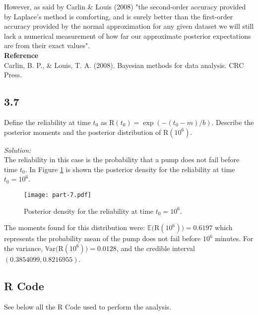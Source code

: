 \documentclass[a4paper, 11pt]{article}
\begin{document}
However, as said by Carlin \& Louis (2008) "the second-order accuracy provided by Laplace’s method is comforting, and is surely better than the first-order accuracy provided by the normal approximation for any given dataset we will still lack a numerical measurement of how far our approximate posterior expectations are from their exact values". \\

\noindent
\textbf{Reference} \\
Carlin, B. P., \& Louis, T. A. (2008). Bayesian methods for data analysis. CRC Press.

\subsection*{3.7} Define the reliability at time $t_0$ as R$(t_0) = \exp(-(t_0 -m)/b)$. Describe the posterior moments and the posterior distribution of R$(10^6)$.

\noindent
\textit{Solution:}\\

The reliability in this case is the probability that a pump does not fail before time $t_0$. In Figure \ref{fig5} is shown the posterior density for the reliability at time $t_0 = 10^6$. 

\begin{figure}[H]
\centering
\caption{Posterior density for the reliability at time $t_0 = 10^6$.}
\label{fig5}
\texttt{[image: part-7.pdf]}
\end{figure}

The moments found for this distribution were: $\mathds{E}($R$(10^6)) = 0.6197$ which represents the probability mean of the pump does not fail before $10^6$ minutes. For the variance, $\mathds{V}\mbox{ar}($R$(10^6)) = 0.0128$, and the credible interval $(0.3854099, 0.8216955)$.


\newpage
\subsection*{R Code}

See below all the R Code used to perform the analysis.
\end{document}

